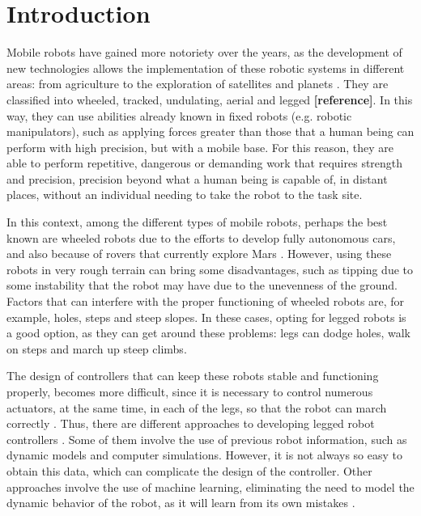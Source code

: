 \section{Introduction}
Mobile robots have gained more notoriety over the years, as the development of new technologies allows the implementation of these robotic systems in different areas: from agriculture to the exploration of satellites and planets \cite{rong2012configuration, arm2019spacebok}. They are classified into wheeled, tracked, undulating, aerial and legged \textbf{[reference]}. In this way, they can use abilities already known in fixed robots (e.g. robotic manipulators), such as applying forces greater than those that a human being can perform with high precision, but with a mobile base. For this reason, they are able to perform repetitive, dangerous or demanding work that requires strength and precision, precision beyond what a human being is capable of, in distant places, without an individual needing to take the robot to the task site.

In this context, among the different types of mobile robots, perhaps the best known are wheeled robots due to the efforts to develop fully autonomous cars, and also because of rovers that currently explore Mars \cite{maurette2003mars}. However, using these robots in very rough terrain can bring some disadvantages, such as tipping due to some instability that the robot may have due to the unevenness of the ground. Factors that can interfere with the proper functioning of wheeled robots are, for example, holes, steps and steep slopes. In these cases, opting for legged robots is a good option, as they can get around these problems: legs can dodge holes, walk on steps and march up steep climbs.

The design of controllers that can keep these robots stable and functioning properly, becomes more difficult, since it is necessary to control numerous actuators, at the same time, in each of the legs, so that the robot can march correctly \cite{cheetah}. Thus, there are different approaches to developing legged robot controllers \cite{kalakrishnan2010fast, bellicoso2018dynamic, heess2016learning, peng2017deeploco}. Some of them involve the use of previous robot information, such as dynamic models and computer simulations. However, it is not always so easy to obtain this data, which can complicate the design of the controller. Other approaches involve the use of machine learning, eliminating the need to model the dynamic behavior of the robot, as it will learn from its own mistakes \cite{kormushev2013reinforcement}.

